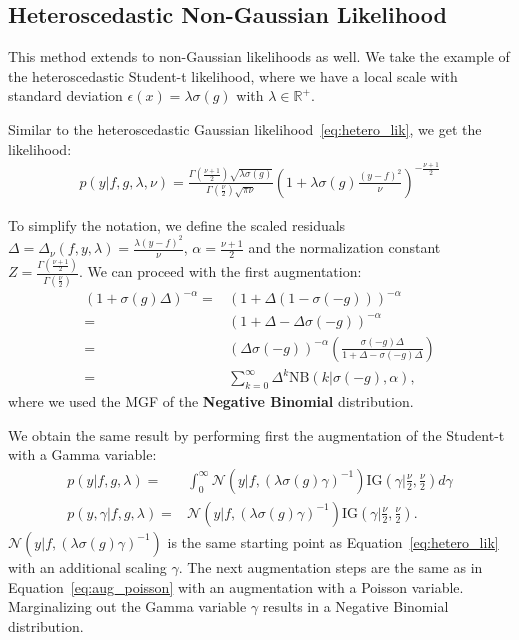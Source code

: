 \subsection{Heteroscedastic Non-Gaussian Likelihood}
\label{sec:heteroscedastic_nongaussian}
This method extends to non-Gaussian likelihoods as well.
We take the example of the heteroscedastic Student-t likelihood, where we have a local scale with standard deviation $\epsilon(x) = \lambda \sigma(g)$ with $\lambda \in \mathbb{R}^+$.

Similar to the heteroscedastic Gaussian likelihood~\eqref{eq:hetero_lik}, we get the likelihood:
\begin{align}
    p(y|f,g,\lambda,\nu) = \frac{\Gamma(\frac{\nu+1}{2})\sqrt{\lambda\sigma(g)}}{\Gamma(\frac{\nu}{2})\sqrt{\pi\nu}}\left(1 + \lambda \sigma(g)\frac{(y-f)^2}{\nu}\right)^{-\frac{\nu+1}{2}}
    \label{eq:hetero_studentt}
\end{align}

To simplify the notation, we define the scaled residuals $\Delta=\Delta_\nu(f,y,\lambda) = \frac{\lambda(y-f)^2}{\nu}$, $\alpha =\frac{\nu+1}{2}$ and the normalization constant $Z = \frac{\Gamma(\frac{\nu+1}{2})}{\Gamma(\frac{\nu}{2})}$.
We can proceed with the first augmentation:
\begin{align}
    (1 + \sigma(g)\Delta)^{-\alpha} =& (1 + \Delta(1 - \sigma(-g)))^{-\alpha}\nonumber\\
    =&(1 + \Delta - \Delta\sigma(-g))^{-\alpha}\nonumber\\
    =& (\Delta\sigma(-g))^{-\alpha}\left(\frac{\sigma(-g)\Delta}{1 + \Delta -\sigma(-g)\Delta}\right)\nonumber\\
    =&\sum_{k=0}^{\infty} \Delta^k \mathrm{NB}(k|\sigma(-g),\alpha),\label{eq:negativebinomial}
\end{align}
where we used the \ac{MGF} of the \textbf{Negative Binomial} distribution.

We obtain the same result by performing first the augmentation of the Student-t with a Gamma variable:
\begin{align}
    p(y|f,g,\lambda) =& \int_0^\infty \mathcal{N}(y| f, (\lambda\sigma(g)\gamma)^{-1})\mathrm{IG}(\gamma|\frac{\nu}{2},\frac{\nu}{2})d\gamma\nonumber\\
    p(y,\gamma|f,g,\lambda)=& \mathcal{N}(y| f, (\lambda\sigma(g)\gamma)^{-1})\mathrm{IG}\left(\gamma|\frac{\nu}{2},\frac{\nu}{2}\right).\label{eq:aug_gamma_studentt}
\end{align}
$\mathcal{N}(y| f, (\lambda\sigma(g)\gamma)^{-1})$ is the same starting point as Equation~\eqref{eq:hetero_lik} with an additional scaling $\gamma$.
The next augmentation steps are the same as in Equation~\eqref{eq:aug_poisson} with an augmentation with a Poisson variable.
Marginalizing out the Gamma variable $\gamma$ results in a Negative Binomial distribution.

